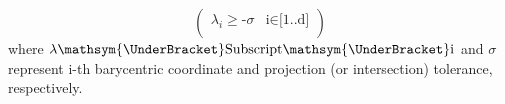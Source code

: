 \begin{equation} \label{eq:projtol}
	\left(
\begin{array}{cc}
 \lambda _i\text{$\geq $-$\sigma $} & \text{i$\in $[1..d]} \\
\end{array}
\right)
\end{equation}
where $\text{$\lambda \mathsym{\UnderBracket}$Subscript$\mathsym{\UnderBracket}$i}$ and $\sigma$ represent i-th barycentric coordinate and projection (or intersection) tolerance, respectively.